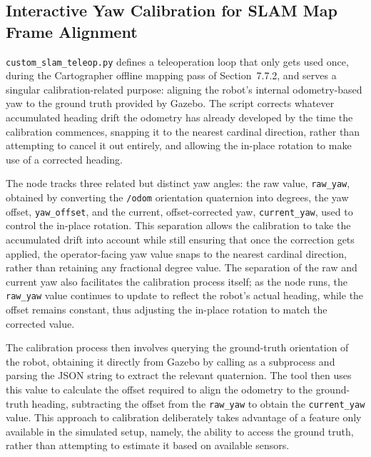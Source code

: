\subsection{Interactive Yaw Calibration for SLAM Map Frame Alignment}

\texttt{custom\_slam\_teleop.py} defines a teleoperation loop that only gets used once, during the Cartographer offline mapping pass of Section~7.7.2, and serves a singular calibration-related purpose: aligning the robot's internal odometry-based yaw to the ground truth provided by Gazebo. The script corrects whatever accumulated heading drift the odometry has already developed by the time the calibration commences, snapping it to the nearest cardinal direction, rather than attempting to cancel it out entirely, and allowing the in-place rotation to make use of a corrected heading.

The node tracks three related but distinct yaw angles: the raw value, \texttt{raw\_yaw}, obtained by converting the \texttt{/odom} orientation quaternion into degrees, the yaw offset, \texttt{yaw\_offset}, and the current, offset-corrected yaw, \texttt{current\_yaw}, used to control the in-place rotation. This separation allows the calibration to take the accumulated drift into account while still ensuring that once the correction gets applied, the operator-facing yaw value snaps to the nearest cardinal direction, rather than retaining any fractional degree value. The separation of the raw and current yaw also facilitates the calibration process itself; as the node runs, the \texttt{raw\_yaw} value continues to update to reflect the robot's actual heading, while the offset remains constant, thus adjusting the in-place rotation to match the corrected value.

The calibration process then involves querying the ground-truth orientation of the robot, obtaining it directly from Gazebo by calling  as a subprocess and parsing the JSON string to extract the relevant quaternion. The tool then uses this value to calculate the offset required to align the odometry to the ground-truth heading, subtracting the offset from the \texttt{raw\_yaw} to obtain the \texttt{current\_yaw} value. This approach to calibration deliberately takes advantage of a feature only available in the simulated setup, namely, the ability to access the ground truth, rather than attempting to estimate it based on available sensors.

